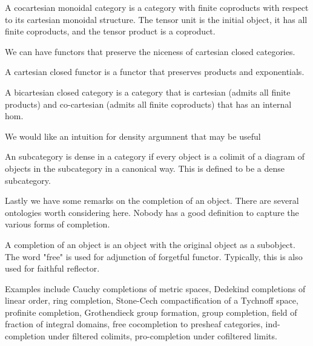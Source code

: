 \begin{definition}
    \label{definition-cocartesian-monoidal}
    A cocartesian monoidal category is a category with finite coproducts with respect to its cartesian monoidal structure. The tensor unit is the initial object, it has all finite coproducts, and the tensor product is a coproduct. 
\end{definition}

We can have functors that preserve the niceness of cartesian closed categories.

\begin{definition}
    \label{definition-cartesian-closed}
    A cartesian closed functor is a functor that preserves products and exponentials.
\end{definition}

\begin{definition}
    \label{definition-bicartesian-closed}
    A bicartesian closed category is a category that is cartesian (admits all finite products) and co-cartesian (admits all finite coproducts) that has an internal hom.
\end{definition}

We would like an intuition for density argumnent that may be useful

\begin{definition}
    \label{definition-dense-in-category}
    An subcategory is dense in a category if every object is a colimit of a diagram of objects in the subcategory in a canonical way.
    This is defined to be a dense subcategory.
\end{definition}

Lastly we have some remarks on the completion of an object. There are several ontologies worth considering here.
Nobody has a good definition to capture the various forms of completion.

\begin{remark}
    A completion of an object is an object with the original object as a subobject. The word "free" is used for adjunction of forgetful functor. Typically, this is also used for faithful reflector.
    
    Examples include Cauchy completions of metric spaces, Dedekind completions of linear order, ring completion, Stone-Cech compactification of a Tychnoff space, profinite completion, Grothendieck group formation, group completion, field of fraction of integral domains, free cocompletion to presheaf categories, ind-completion under filtered colimits, pro-completion under cofiltered limits.
\end{remark}


